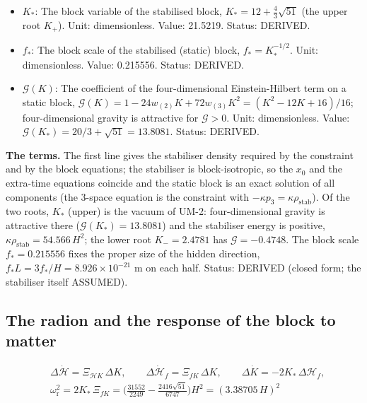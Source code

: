 \documentclass[
  10pt,
]{article}
\begin{document}
\begin{itemize}
  21.5219 and 2.4781. Status: DERIVED.
\item
  \(K_*\): The block variable of the stabilised block,
  \(K_* = 12 + \frac43\sqrt{51}\) (the upper root \(K_+\)). Unit:
  dimensionless. Value: 21.5219. Status: DERIVED.
\item
  \(f_*\): The block scale of the stabilised (static) block,
  \(f_* = K_*^{-1/2}\). Unit: dimensionless. Value: 0.215556. Status:
  DERIVED.
\item
  \(\mathcal{G}(K)\): The coefficient of the four-dimensional
  Einstein-Hilbert term on a static block,
  \(\mathcal{G}(K) = 1 - 24w_{(2)}K + 72w_{(3)}K^2 = (K^2 - 12K + 16)/16\);
  four-dimensional gravity is attractive for \(\mathcal{G} > 0\). Unit:
  dimensionless. Value:
  \(\mathcal{G}(K_*) = 20/3 + \sqrt{51} = 13.8081\). Status: DERIVED.
\end{itemize}

\textbf{The terms.} The first line gives the stabiliser density required
by the constraint and by the block equations; the stabiliser is
block-isotropic, so the \(x_0\) and the extra-time equations coincide
and the static block is an exact solution of all components (the 3-space
equation is the constraint with
\(-\kappa p_3 = \kappa\rho_{\mathrm{stab}}\)). Of the two roots, \(K_*\)
(upper) is the vacuum of UM-2: four-dimensional gravity is attractive
there (\(\mathcal{G}(K_*) = 13.8081\)) and the stabiliser energy is
positive, \(\kappa\rho_{\mathrm{stab}} = 54.566\,H^2\); the lower root
\(K_- = 2.4781\) has \(\mathcal{G} = -0.4748\). The block scale
\(f_* = 0.215556\) fixes the proper size of the hidden direction,
\(f_*L = 3f_*/H = 8.926\times10^{-21}\) m on each half. Status: DERIVED
(closed form; the stabiliser itself ASSUMED).

\hypertarget{the-radion-and-the-response-of-the-block-to-matter}{%
\subsection{The radion and the response of the block to
matter}\label{the-radion-and-the-response-of-the-block-to-matter}}

\[
\begin{aligned}
&\Delta\dot{\mathcal{H}} = \Xi_{\mathcal{H}K}\,\Delta K,\qquad \Delta\dot{\mathcal{H}}_f =
 \Xi_{fK}\,\Delta K,\qquad
 \Delta\dot K = -2K_*\,\Delta\mathcal{H}_f,\\
&\omega_{\mathrm{r}}^2 = 2K_*\,\Xi_{fK} = \Big(\frac{31552}{2249} - \frac{2416\sqrt{51}}{6747}\Big)H^2 =
 (3.38705\,H)^2
\end{aligned} \tag{FE-44}
\]
\end{document}
